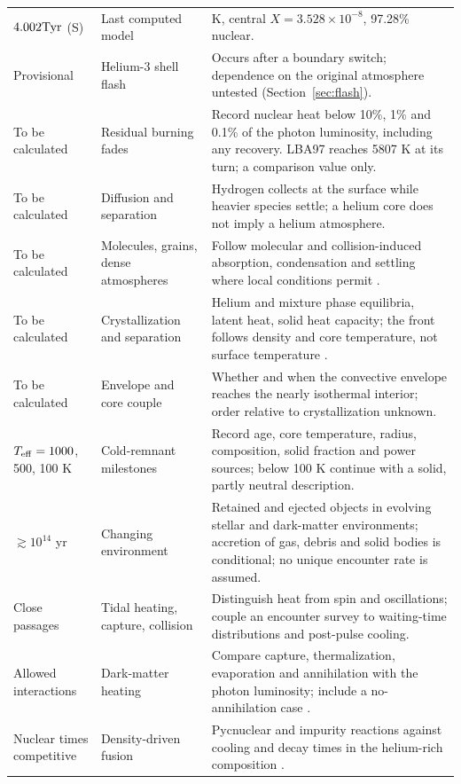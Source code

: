 {\begin{longtable}{@{}>{\raggedright\arraybackslash}p{}>{\raggedright\arraybackslash}p{}>{\raggedright\arraybackslash}p{}@{}}
$4.002\mathrm{Tyr}$ (S) & Last computed model & 4612 K, central $X=3.528\times10^{-8}$, 97.28\% nuclear. \\[3pt]
Provisional & Helium-3 shell flash & Occurs after a boundary switch; dependence on the original atmosphere untested (Section~\ref{sec:flash}). \\[3pt]
To be calculated & Residual burning fades & Record nuclear heat below 10\%, 1\% and 0.1\% of the photon luminosity, including any recovery. LBA97 reaches 5807 K at its turn; a comparison value only. \\[3pt]
To be calculated & Diffusion and separation & Hydrogen collects at the surface while heavier species settle; a helium core does not imply a helium atmosphere. \\[3pt]
To be calculated & Molecules, grains, dense atmospheres & Follow molecular and collision-induced absorption, condensation and settling where local conditions permit \cite{chabrier00,blouin18}. \\[3pt]
To be calculated & Crystallization and separation & Helium and mixture phase equilibria, latent heat, solid heat capacity; the front follows density and core temperature, not surface temperature \cite{baiko22}. \\[3pt]
To be calculated & Envelope and core couple & Whether and when the convective envelope reaches the nearly isothermal interior; order relative to crystallization unknown. \\[3pt]
$T_{\rm eff}=1000$, 500, 100 K & Cold-remnant milestones & Record age, core temperature, radius, composition, solid fraction and power sources; below 100 K continue with a solid, partly neutral description. \\[3pt]
$\gtrsim10^{14}$ yr & Changing environment & Retained and ejected objects in evolving stellar and dark-matter environments; accretion of gas, debris and solid bodies is conditional; no unique encounter rate is assumed. \\[3pt]
Close passages & Tidal heating, capture, collision & Distinguish heat from spin and oscillations; couple an encounter survey to waiting-time distributions and post-pulse cooling. \\[3pt]
Allowed interactions & Dark-matter heating & Compare capture, thermalization, evaporation and annihilation with the photon luminosity; include a no-annihilation case \cite{bell24}. \\[3pt]
Nuclear times competitive & Density-driven fusion & Pycnuclear and impurity reactions against cooling and decay times in the helium-rich composition \cite{gasques05}. \\
\bottomrule
\end{longtable}}

